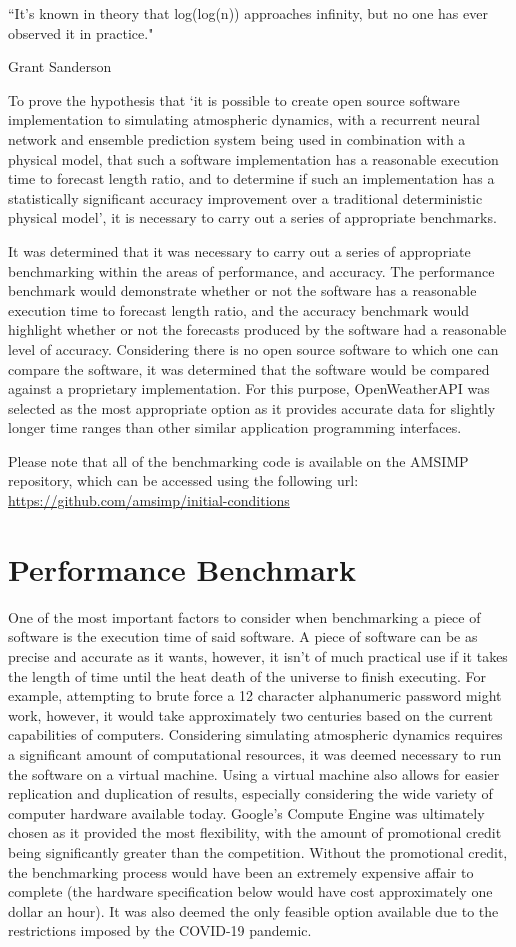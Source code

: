 \epigraph{``It's known in theory that log(log(n)) approaches infinity, but no one has ever observed it in practice."}{Grant Sanderson}

To prove the hypothesis that `it is possible to create open source software implementation to simulating atmospheric dynamics, with a recurrent neural network and ensemble prediction system being used in combination with a physical model, that such a software implementation has a reasonable execution time to forecast length ratio, and to determine if such an implementation has a statistically significant accuracy improvement over a traditional deterministic physical model', it is necessary to carry out a series of appropriate benchmarks.

It was determined that it was necessary to carry out a series of appropriate benchmarking within the areas of performance, and accuracy. The performance benchmark would demonstrate whether or not the software has a reasonable execution time to forecast length ratio, and the accuracy benchmark would highlight whether or not the forecasts produced by the software had a reasonable level of accuracy. Considering there is no open source software to which one can compare the software, it was determined that the software would be compared against a proprietary implementation. For this purpose, OpenWeatherAPI was selected as the most appropriate option as it provides accurate data for slightly longer time ranges than other similar application programming interfaces\cite{owa}. 

Please note that all of the benchmarking code is available on the AMSIMP repository, which can be accessed using the following url: \url{https://github.com/amsimp/initial-conditions}

\section{Performance Benchmark}
One of the most important factors to consider when benchmarking a piece of software is the execution time of said software. A piece of software can be as precise and accurate as it wants, however, it isn't of much practical use if it takes the length of time until the heat death of the universe to finish executing. For example, attempting to brute force a 12 character alphanumeric password might work, however, it would take approximately two centuries based on the current capabilities of computers. Considering simulating atmospheric dynamics requires a significant amount of computational resources, it was deemed necessary to run the software on a virtual machine. Using a virtual machine also allows for easier replication and duplication of results, especially considering the wide variety of computer hardware available today. Google's Compute Engine was ultimately chosen as it provided the most flexibility, with the amount of promotional credit being significantly greater than the competition. Without the promotional credit, the benchmarking process would have been an extremely expensive affair to complete (the hardware specification below would have cost approximately one dollar an hour). It was also deemed the only feasible option available due to the restrictions imposed by the COVID-19 pandemic. 

